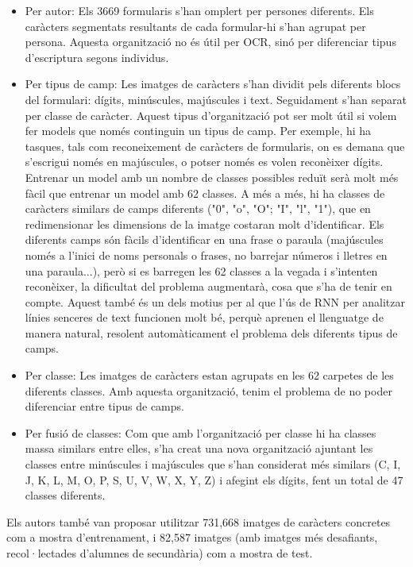 \documentclass[12pt, spanish]{article}
\begin{document}
\begin{itemize}
\item Per autor: Els 3669 formularis s'han omplert per persones diferents. Els caràcters segmentats resultants de cada formular-hi s'han agrupat per persona. Aquesta organització no és útil per OCR, sinó per diferenciar tipus d'escriptura segons individus.

\item Per tipus de camp: Les imatges de caràcters s'han dividit pels diferents blocs del formulari: dígits, minúscules, majúscules i text. Seguidament s'han separat per classe de caràcter. Aquest tipus d'organització pot ser molt útil si volem fer models que només continguin un tipus de camp. Per exemple, hi ha tasques, tals com reconeixement de caràcters de formularis, on es demana que s'escrigui només en majúscules, o potser només es volen reconèixer dígits. Entrenar un model amb un nombre de classes possibles reduït serà molt més fàcil que entrenar un model amb 62 classes. A més a més, hi ha classes de caràcters similars de camps diferents ("0", "o", "O"; "I", "l", "1"), que en redimensionar les dimensions de la imatge costaran molt d'identificar. Els diferents camps són fàcils d'identificar en una frase o paraula (majúscules només a l'inici de noms personals o frases, no barrejar números i lletres en una paraula...), però si es barregen les 62 classes a la vegada i s'intenten reconèixer, la dificultat del problema augmentarà, cosa que s'ha de tenir en compte. Aquest també és un dels motius per al que l'ús de RNN per analitzar línies senceres de text funcionen molt bé, perquè aprenen el llenguatge de manera natural, resolent automàticament el problema dels diferents tipus de camps. 

\item Per classe: Les imatges de caràcters estan agrupats en les 62 carpetes de les diferents classes. Amb aquesta organització, tenim el problema de no poder diferenciar entre tipus de camps. 

\item Per fusió de classes: Com que amb l'organització per classe hi ha classes massa similars entre elles, s'ha creat una nova organització ajuntant les classes entre minúscules i majúscules  que s'han considerat més similars (C, I, J, K, L, M, O, P, S, U, V, W, X, Y, Z) i afegint els dígits, fent un total de 47 classes diferents.
\end{itemize}

Els autors també van proposar utilitzar 731,668 imatges de caràcters concretes com a mostra d'entrenament, i 82,587 imatges (amb imatges més desafiants, recol·lectades d'alumnes de secundària) com a mostra de test.
\end{document}
